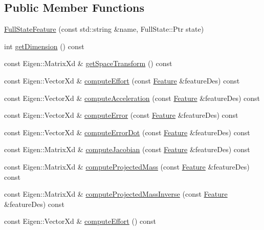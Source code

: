 \subsection*{Public Member Functions}
\begin{DoxyCompactItemize}
\item 
\hyperlink{classocra_1_1FullStateFeature_a58460a5615fefc0b12b5a04767ea2386}{Full\+State\+Feature} (const std\+::string \&name, Full\+State\+::\+Ptr state)
\item 
int \hyperlink{classocra_1_1FullStateFeature_a62b4a9dd7055ab47105c8aefaa45611a}{get\+Dimension} () const
\item 
const Eigen\+::\+Matrix\+Xd \& \hyperlink{classocra_1_1FullStateFeature_a2f6672c0d5a13df8fc4f38f011c8c32e}{get\+Space\+Transform} () const
\item 
const Eigen\+::\+Vector\+Xd \& \hyperlink{classocra_1_1FullStateFeature_aac81e14af36ee0fb2ff24f991a1915eb}{compute\+Effort} (const \hyperlink{classocra_1_1Feature}{Feature} \&feature\+Des) const
\item 
const Eigen\+::\+Vector\+Xd \& \hyperlink{classocra_1_1FullStateFeature_a1ca39e66ea07182b46ba7e60477efb17}{compute\+Acceleration} (const \hyperlink{classocra_1_1Feature}{Feature} \&feature\+Des) const
\item 
const Eigen\+::\+Vector\+Xd \& \hyperlink{classocra_1_1FullStateFeature_ab1b5ffc62eba180926f7b90e6318ee6f}{compute\+Error} (const \hyperlink{classocra_1_1Feature}{Feature} \&feature\+Des) const
\item 
const Eigen\+::\+Vector\+Xd \& \hyperlink{classocra_1_1FullStateFeature_a0d3e5b76bdcae8e06df07c7f525ad690}{compute\+Error\+Dot} (const \hyperlink{classocra_1_1Feature}{Feature} \&feature\+Des) const
\item 
const Eigen\+::\+Matrix\+Xd \& \hyperlink{classocra_1_1FullStateFeature_abcd0254d7836bea5531d49afff872d20}{compute\+Jacobian} (const \hyperlink{classocra_1_1Feature}{Feature} \&feature\+Des) const
\item 
const Eigen\+::\+Matrix\+Xd \& \hyperlink{classocra_1_1FullStateFeature_a40f68dad4e231a19b6566fa6829b8f90}{compute\+Projected\+Mass} (const \hyperlink{classocra_1_1Feature}{Feature} \&feature\+Des) const
\item 
const Eigen\+::\+Matrix\+Xd \& \hyperlink{classocra_1_1FullStateFeature_a53b841962a372665dbd0ec7a94c4cd74}{compute\+Projected\+Mass\+Inverse} (const \hyperlink{classocra_1_1Feature}{Feature} \&feature\+Des) const
\item 
const Eigen\+::\+Vector\+Xd \& \hyperlink{classocra_1_1FullStateFeature_a65b58a3fac72eab7f9bd18cb20775798}{compute\+Effort} () const

\end{DoxyCompactItemize}
